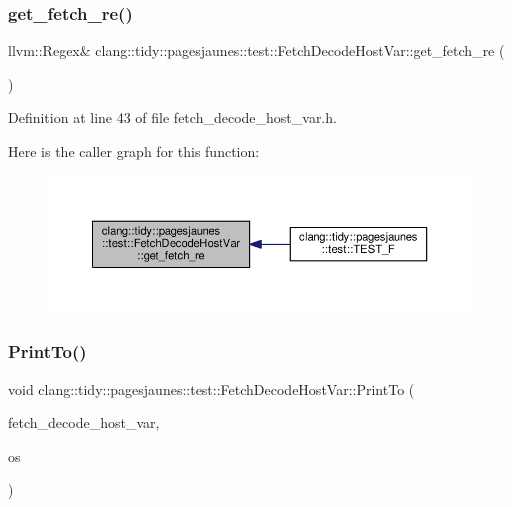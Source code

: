 \subsubsection{\texorpdfstring{get\+\_\+fetch\+\_\+re()}{get\_fetch\_re()}}
{\footnotesize\ttfamily llvm\+::\+Regex\& clang\+::tidy\+::pagesjaunes\+::test\+::\+Fetch\+Decode\+Host\+Var\+::get\+\_\+fetch\+\_\+re (\begin{DoxyParamCaption}{ }\end{DoxyParamCaption})\hspace{0.3cm}{\ttfamily [inline]}}



Definition at line 43 of file fetch\+\_\+decode\+\_\+host\+\_\+var.\+h.

Here is the caller graph for this function\+:
\nopagebreak
\begin{figure}[H]
\begin{center}
\leavevmode
\includegraphics[width=350pt]{classclang_1_1tidy_1_1pagesjaunes_1_1test_1_1_fetch_decode_host_var_af0fe719b55f4bee9a190470cf326c9e0_icgraph}
\end{center}
\end{figure}
\mbox{\label{classclang_1_1tidy_1_1pagesjaunes_1_1test_1_1_fetch_decode_host_var_a4ffa3eb01a89fb7e76014822bb536cd2}} 
\subsubsection{\texorpdfstring{Print\+To()}{PrintTo()}}
{\footnotesize\ttfamily void clang\+::tidy\+::pagesjaunes\+::test\+::\+Fetch\+Decode\+Host\+Var\+::\+Print\+To (\begin{DoxyParamCaption}\item[{const \hyperlink{classclang_1_1tidy_1_1pagesjaunes_1_1test_1_1_fetch_decode_host_var}{Fetch\+Decode\+Host\+Var} \&}]{fetch\+\_\+decode\+\_\+host\+\_\+var,  }\item[{\+::std\+::ostream $\ast$}]{os }\end{DoxyParamCaption})}



